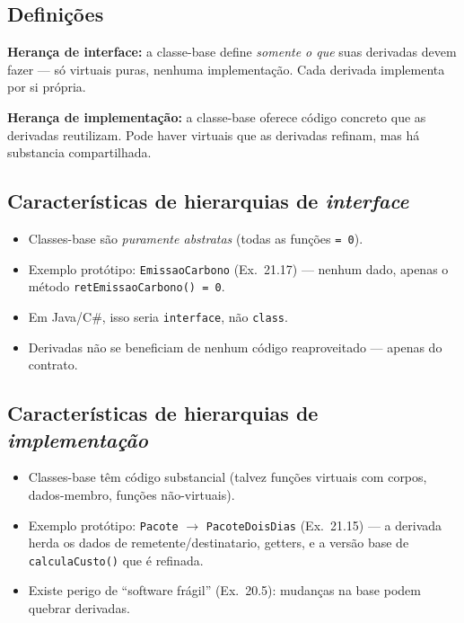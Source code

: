 \documentclass[11pt,a4paper]{article}
\begin{document}
\subsection*{Defini\c{c}\~oes}

\textbf{Heran\c{c}a de interface:} a classe-base define \emph{somente o que} suas derivadas devem fazer --- s\'o virtuais puras, nenhuma implementa\c{c}\~ao. Cada derivada implementa por si pr\'opria.

\textbf{Heran\c{c}a de implementa\c{c}\~ao:} a classe-base oferece c\'odigo concreto que as derivadas reutilizam. Pode haver virtuais que as derivadas refinam, mas h\'a substancia compartilhada.

\subsection*{Caracter\'isticas de hierarquias de \emph{interface}}

\begin{itemize}[leftmargin=*,itemsep=0pt]
  \item Classes-base s\~ao \emph{puramente abstratas} (todas as fun\c{c}\~oes \texttt{= 0}).
  \item Exemplo prot\'otipo: \texttt{EmissaoCarbono} (Ex.~21.17) --- nenhum dado, apenas o m\'etodo \texttt{retEmissaoCarbono() = 0}.
  \item Em Java/C\#, isso seria \texttt{interface}, n\~ao \texttt{class}.
  \item Derivadas n\~ao se beneficiam de nenhum c\'odigo reaproveitado --- apenas do contrato.
\end{itemize}

\subsection*{Caracter\'isticas de hierarquias de \emph{implementa\c{c}\~ao}}

\begin{itemize}[leftmargin=*,itemsep=0pt]
  \item Classes-base t\^em c\'odigo substancial (talvez fun\c{c}\~oes virtuais com corpos, dados-membro, fun\c{c}\~oes n\~ao-virtuais).
  \item Exemplo prot\'otipo: \texttt{Pacote} $\to$ \texttt{PacoteDoisDias} (Ex.~21.15) --- a derivada herda os dados de remetente/destinatario, getters, e a vers\~ao base de \texttt{calculaCusto()} que \'e refinada.
  \item Existe perigo de ``software fr\'agil'' (Ex.~20.5): mudan\c{c}as na base podem quebrar derivadas.
\end{itemize}
\end{document}
